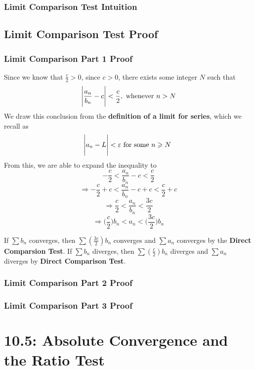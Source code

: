 \documentclass{report}
\begin{document}
\begin{sloppypar}
\begin{center}
{{    }
  }
\end{center}
\subsection{Limit Comparison Test Intuition}

\section{Limit Comparison Test Proof}
\subsection{Limit Comparison Part 1 Proof}
Since we know that $ \frac{c}{2} > 0 $, since
$ c > 0 $, there exists some integer $ N $
such that
\[ \Biggr| \frac{a_{n}}{b_{n}} - c \Biggr| <
  \frac{c}{2}, \textrm{ whenever $ n > N$} \]
We draw this conclusion from the
\textbf{definition of a limit for series}, which
we recall as
\[ \Biggr| a_{n} - L \Biggr|
  < \varepsilon \textrm{ for some $ n \geq N $ } \]
From this, we are able to expand the inequality
to
\[ - \frac{c}{2} < \frac{a_{n}}{b_{n}} - c  <
  \frac{c}{2} \]
\[ \Rightarrow - \frac{c}{2} + c < \frac{a_{n}}{b_{n}} - c
  + c <
  \frac{c}{2} + c \]
\[ \Rightarrow \frac{c}{2} < \frac{a_{n}}{b_{n}}
  < \frac{3c}{2}\]
\[ \Rightarrow \Biggr( \frac{c}{2} \Biggr) b_{n}
  < a_{n}
  < \Biggr( \frac{3c}{2} \Biggr) b_{n}\]

If $ \sum b_{n} $ converges, then $ \sum (\frac{3c}{2})b_{n}$
converges and $ \sum a_{n} $ converges by the
\textbf{Direct Comparsion Test}. If $ \sum b_{n} $
diverges, then $ \sum (\frac{c}{2}) b_{n} $ diverges
and $ \sum a_{n}$ diverges by \textbf{Direct Comparison
Test}.


\subsection{Limit Comparison Part 2 Proof}
\subsection{Limit Comparison Part 3 Proof}












\chapter{10.5: Absolute Convergence and the Ratio Test}

\end{sloppypar}
\end{document}
